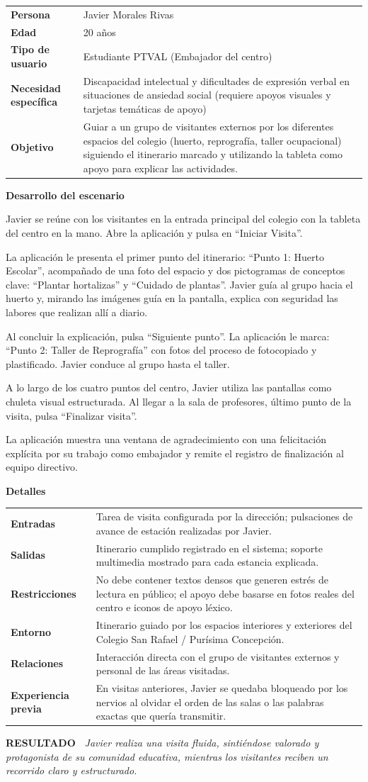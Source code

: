 \documentclass[11pt,a4paper]{article}
\makeatletter
\newcommand{\escenariocard}[6]{%
\needspace{10\baselineskip}
\begin{tcolorbox}[breakable,enhanced,colback=white,colframe=brandgreen,boxrule=0.8pt,arc=3pt,
  left=9pt,right=9pt,top=7pt,bottom=7pt,before skip=10pt,after skip=10pt,
  title={\textbf{\color{white}ESCENARIO #1} \\[1pt] {\small\color{tintgreen}#2}},
  colbacktitle=brandgreen,coltitle=white,fonttitle=\bfseries,boxed title style={colframe=brandgreen}]
{\setlength{\parskip}{0pt}\renewcommand{\arraystretch}{1.35}\rowcolors{1}{tintgreen}{white}\arrayrulecolor{white}
\begin{tabular}{@{\hspace{4pt}}>{\bfseries\color{brandgreen}}p{3.4cm}p{11.4cm}@{}}
#3 \\
\end{tabular}}
\vspace{6pt}
\textbf{\color{brandblue}Desarrollo del escenario}\par\vspace{2pt}
#4
\par\vspace{4pt}
\textbf{\color{brandblue}Detalles}\par\vspace{2pt}
{\setlength{\parskip}{0pt}\renewcommand{\arraystretch}{1.35}\rowcolors{1}{tintblue}{white}\arrayrulecolor{white}
\begin{tabular}{@{\hspace{4pt}}>{\bfseries\color{brandblue}}p{3.4cm}p{11.4cm}@{}}
#5 \\
\end{tabular}}
\vspace{6pt}
\begin{tcolorbox}[colback=tintblue,colframe=brandblue,boxrule=0pt,sharp corners,borderline west={3pt}{0pt}{brandblue},left=8pt,right=8pt,top=5pt,bottom=5pt]
\textbf{\small\color{brandblue}RESULTADO\ } {\small\itshape #6}
\end{tcolorbox}
\end{tcolorbox}
}
\makeatother
\begin{document}
\escenariocard{4}{Desempeño del rol de guía de visita para personas externas al centro}{%
Persona & Javier Morales Rivas \\
Edad & 20 años \\
Tipo de usuario & Estudiante PTVAL (Embajador del centro) \\
Necesidad específica & Discapacidad intelectual y dificultades de expresión verbal en situaciones de ansiedad social (requiere apoyos visuales y tarjetas temáticas de apoyo) \\
Objetivo & Guiar a un grupo de visitantes externos por los diferentes espacios del colegio (huerto, reprografía, taller ocupacional) siguiendo el itinerario marcado y utilizando la tableta como apoyo para explicar las actividades.
}{%
Javier se reúne con los visitantes en la entrada principal del colegio con la tableta del centro en la mano. Abre la aplicación y pulsa en ``Iniciar Visita''.

La aplicación le presenta el primer punto del itinerario: ``Punto 1: Huerto Escolar'', acompañado de una foto del espacio y dos pictogramas de conceptos clave: ``Plantar hortalizas'' y ``Cuidado de plantas''. Javier guía al grupo hacia el huerto y, mirando las imágenes guía en la pantalla, explica con seguridad las labores que realizan allí a diario.

Al concluir la explicación, pulsa ``Siguiente punto''. La aplicación le marca: ``Punto 2: Taller de Reprografía'' con fotos del proceso de fotocopiado y plastificado. Javier conduce al grupo hasta el taller.

A lo largo de los cuatro puntos del centro, Javier utiliza las pantallas como chuleta visual estructurada. Al llegar a la sala de profesores, último punto de la visita, pulsa ``Finalizar visita''.

La aplicación muestra una ventana de agradecimiento con una felicitación explícita por su trabajo como embajador y remite el registro de finalización al equipo directivo.
}{%
Entradas & Tarea de visita configurada por la dirección; pulsaciones de avance de estación realizadas por Javier. \\
Salidas & Itinerario cumplido registrado en el sistema; soporte multimedia mostrado para cada estancia explicada. \\
Restricciones & No debe contener textos densos que generen estrés de lectura en público; el apoyo debe basarse en fotos reales del centro e iconos de apoyo léxico. \\
Entorno & Itinerario guiado por los espacios interiores y exteriores del Colegio San Rafael / Purísima Concepción. \\
Relaciones & Interacción directa con el grupo de visitantes externos y personal de las áreas visitadas. \\
Experiencia previa & En visitas anteriores, Javier se quedaba bloqueado por los nervios al olvidar el orden de las salas o las palabras exactas que quería transmitir.
}{Javier realiza una visita fluida, sintiéndose valorado y protagonista de su comunidad educativa, mientras los visitantes reciben un recorrido claro y estructurado.}
\end{document}
